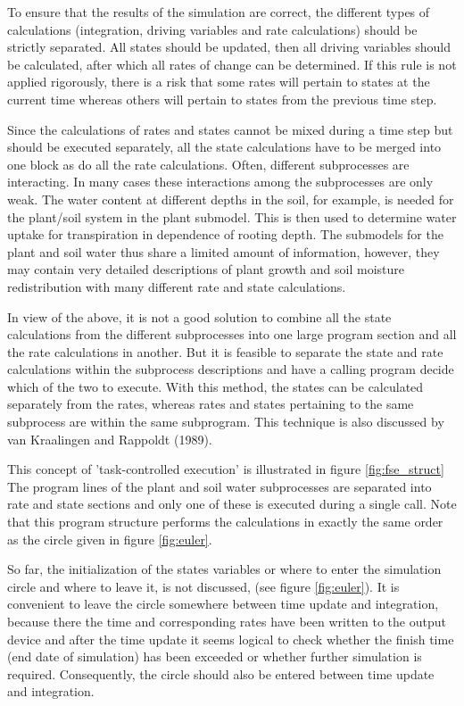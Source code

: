 To ensure that the results of the simulation are correct, the different types of calculations
(integration, driving variables and rate calculations) should be strictly separated. All states
should be updated, then all driving variables should be calculated, after which all rates of
change can be determined. If this rule is not applied rigorously, there is a risk that some
rates will pertain to states at the current time whereas others will pertain to states from
the previous time step.

Since the calculations of rates and states cannot be mixed during a time step but should be
executed separately, all the state calculations have to be merged into one block as do all
the rate calculations. Often, different subprocesses are interacting. In many cases these
interactions among the subprocesses are only weak. The water content at different depths
in the soil, for example, is needed for the plant/soil system in the plant submodel. This is
then used to determine water uptake for transpiration in dependence of rooting depth. The
submodels for the plant and soil water thus share a limited amount of information,
however, they may contain very detailed descriptions of plant growth and soil moisture
redistribution with many different rate and state calculations.

In view of the above, it is not a good solution to combine all the state calculations from
the different subprocesses into one large program section and all the rate calculations in
another. But it is feasible to separate the state and rate calculations within the subprocess
descriptions and have a calling program decide which of the two to execute. With this
method, the states can be calculated separately from the rates, whereas rates and states
pertaining to the same subprocess are within the same subprogram. This technique is also
discussed by van Kraalingen and Rappoldt (1989).

This concept of 'task-controlled execution' is illustrated in figure \ref{fig:fse_struct} The program lines
of the plant and soil water subprocesses are separated into rate and state sections and only
one of these is executed during a single call. Note that this program structure performs
the calculations in exactly the same order as the circle given in figure \ref{fig:euler}.

So far, the initialization of the states variables or where to enter the simulation circle and
where to leave it, is not discussed, (see figure \ref{fig:euler}). It is convenient to leave the circle
somewhere between time update and integration, because there the time and corresponding 
rates have been written to the output device and after the time update it seems logical
to check whether the finish time (end date of simulation) has been exceeded or whether
further simulation is required. Consequently, the circle should also be entered between
time update and integration.

